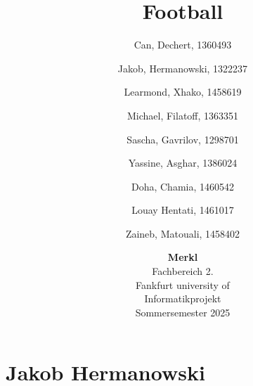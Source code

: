 \documentclass[12pt]{article}
\author{
	Can, Dechert, 1360493\\
	\and
	Jakob, Hermanowski, 1322237\\
	\and
	Learmond, Xhako, 1458619\\
	\and
	Michael, Filatoff, 1363351\\
	\and
	Sascha, Gavrilov, 1298701\\
	\and
	Yassine, Asghar, 1386024\\
	\and
	Doha, Chamia, 1460542\\
	\and
	Louay Hentati, 1461017\\
	\and
Zaineb, Matouali, 1458402}
\title{Football}
\date{\vspace{0.5cm}
	\textbf{Merkl}
	\vspace{0.5cm}\\
	Fachbereich 2.
	\vspace{0.5cm}\\
	Fankfurt university of
	\vspace{0.5cm} \\
	Informatikprojekt
	\vspace{0.5cm} \\
	Sommersemester 2025}
\begin{document}
\maketitle

\pagebreak
\section{Jakob Hermanowski}

\end{document}
